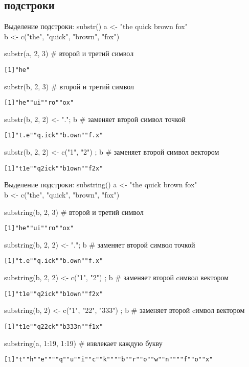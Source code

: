 \subsection{подстроки}
\begin{frame}{Выделение подстроки: substr()}
a <- "the quick brown fox"\\
b <- c("the"{}, "quick"{}, "brown"{}, "fox"{})
\begin{itemize}
\mytem substr(a, 2, 3) \hfill \# второй и третий символ
\footnotesize
\begin{alltt}
[1] "he"
\end{alltt}
\normalsize
\vfill
\mytem substr(b, 2, 3) \hfill \# второй и третий символ
\footnotesize
\begin{alltt}
[1] "he"{ }"ui"{ }"ro"{ }"ox"
\end{alltt}
\normalsize
\vfill
\mytem substr(b, 2, 2) <- "."; b \hfill \# заменяет второй символ точкой
\footnotesize
\begin{alltt}
[1] "t.e"{ }"q.ick"{ }"b.own"{ }"f.x"
\end{alltt}
\normalsize
\vfill
\mytem substr(b, 2, 2) <- c("1"{}, "2") ; b \hfill \# заменяет второй символ вектором
\footnotesize
\begin{alltt}
[1] "t1e"{ }"q2ick"{ }"b1own"{ }"f2x"
\end{alltt}
\normalsize
\end{itemize}
\end{frame}
\begin{frame}{Выделение подстроки: substring()}
a <- "the quick brown fox"\\
b <- c("the"{}, "quick"{}, "brown"{}, "fox"{})
\begin{itemize}
\mytem substring(b, 2, 3) \hfill \# второй и третий символ
\footnotesize
\begin{alltt}
[1] "he"{ }"ui"{ }"ro"{ }"ox"
\end{alltt}
\normalsize
\vfill
\mytem substring(b, 2, 2) <- "."; b \hfill \# заменяет второй символ точкой
\footnotesize
\begin{alltt}
[1] "t.e"{ }"q.ick"{ }"b.own"{ }"f.x"
\end{alltt}
\normalsize
\vfill
\mytem substring(b, 2, 2) <- c("1"{}, "2") ; b \hfill \# заменяет второй cимвол вектором
\footnotesize
\begin{alltt}
[1] "t1e"{ }"q2ick"{ }"b1own"{ }"f2x"
\end{alltt}
\normalsize
\vfill
\mytem substring(b, 2) <- c("1"{}, "22"{}, "333") ; b \hfill \# заменяет второй cимвол вектором
\footnotesize
\begin{alltt}
[1] "t1e"{ }"q22ck"{ }"b333n"{ }"f1x"
\end{alltt}
\normalsize
\vfill
\mytem substring(a, 1:19, 1:19) \hfill \# извлекает каждую букву
\scriptsize
\begin{alltt}
[1] "t"{ }"h"{ }"e"{ }"{ }"{ }"q"{ }"u"{ }"i"{ }"c"{ }"k"{ }"{ }"{ }"b"{ }"r"{ }"o"{ }"w"{ }"n"{ }"{ }"{ }"f"{ }"o"{ }"x"
\end{alltt}
\normalsize
\end{itemize}
\end{frame}
